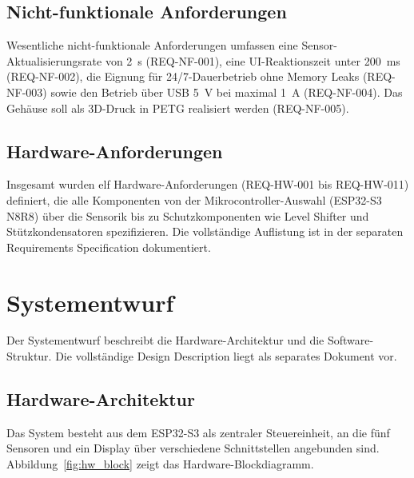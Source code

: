 \subsection{Nicht-funktionale Anforderungen}

Wesentliche nicht-funktionale Anforderungen umfassen eine Sensor-Aktualisierungsrate von \SI{2}{\second} (REQ-NF-001), eine UI-Reaktionszeit unter \SI{200}{\milli\second} (REQ-NF-002), die Eignung für 24/7-Dauerbetrieb ohne Memory Leaks (REQ-NF-003) sowie den Betrieb über USB \SI{5}{\volt} bei maximal \SI{1}{\ampere} (REQ-NF-004). Das Gehäuse soll als 3D-Druck in PETG realisiert werden (REQ-NF-005).

\subsection{Hardware-Anforderungen}

Insgesamt wurden elf Hardware-Anforderungen (REQ-HW-001 bis REQ-HW-011) definiert, die alle Komponenten von der Mikrocontroller-Auswahl (ESP32-S3 N8R8) über die Sensorik bis zu Schutzkomponenten wie Level Shifter und Stützkondensatoren spezifizieren. Die vollständige Auflistung ist in der separaten Requirements Specification dokumentiert.

\section{Systementwurf}
\label{sec:design}

Der Systementwurf beschreibt die Hardware-Architektur und die Software-Struktur. Die vollständige Design Description liegt als separates Dokument vor.

\subsection{Hardware-Architektur}
\label{sec:hw_arch}

Das System besteht aus dem ESP32-S3 als zentraler Steuereinheit, an die fünf Sensoren und ein Display über verschiedene Schnittstellen angebunden sind. Abbildung~\ref{fig:hw_block} zeigt das Hardware-Blockdiagramm.

